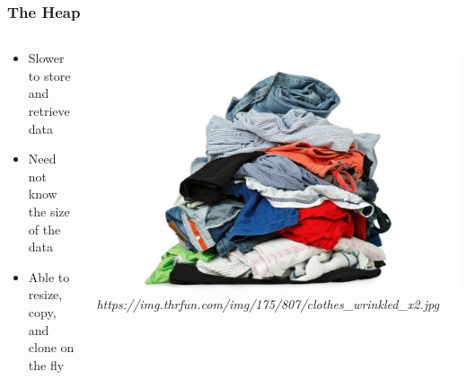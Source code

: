 \documentclass{beamer}
\begin{document}
\begin{frame}
    \frametitle{The Heap}
    \begin{columns}
        \begin{column}{0.5\textwidth}
            \begin{itemize}
                \item Slower to store and retrieve data
                \item Need not know the size of the data
                \item Able to resize, copy, and clone on the fly
            \end{itemize}
        \end{column}
        \begin{column}{0.5\textwidth}
            \includegraphics[width=\textwidth]{images/heap.png}
            \vfill
            \tiny \textit{https://img.thrfun.com/img/175/807/clothes\_wrinkled\_x2.jpg}
        \end{column}
    \end{columns}
\end{frame}
\end{document}
